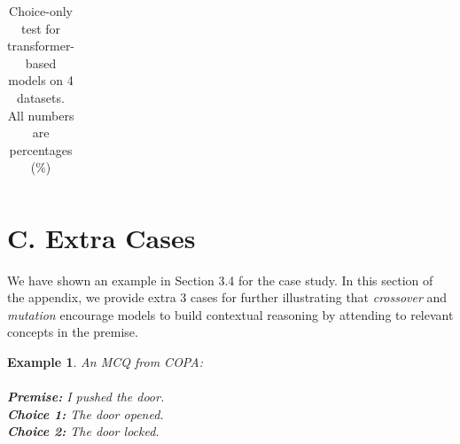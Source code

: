 \documentclass[letterpaper]{article} %
\newtheorem{example}{Example}
\newcommand{\secref}[1]{Section \ref{#1}}
\newcommand{\KZ}[1]{\textcolor{blue}{Kenny: #1}}
\newcommand{\crosssymbol}{{\color{red} \XSolidBrush} }
\newcommand{\checksymbol}{{\color{green} \Checkmark} }
\begin{document}
\begin{table}[th]
\begin{tabular}{c|rrrr}
\bottomrule
\end{tabular}
\caption{Choice-only test for transformer-based models on 4 datasets. All numbers are percentages (\%)}
\label{tab:only-test}
\end{table}

\section{C.   Extra Cases}
We have shown an example in Section 3.4 
for the case study. In this section of the appendix, we 
provide extra 3 cases for further illustrating that \textit{crossover} and \textit{mutation} 
encourage models to build contextual reasoning  
by attending to relevant concepts in the premise. 

\begin{example}\label{ex:copa1}
An MCQ from COPA:\\ \\
\noindent
\textbf{Premise:} I pushed the door. \\
\textbf{Choice 1:} The door opened.  \checksymbol  \\
\textbf{Choice 2:} The door locked. \crosssymbol
\end{example}
\end{document}
